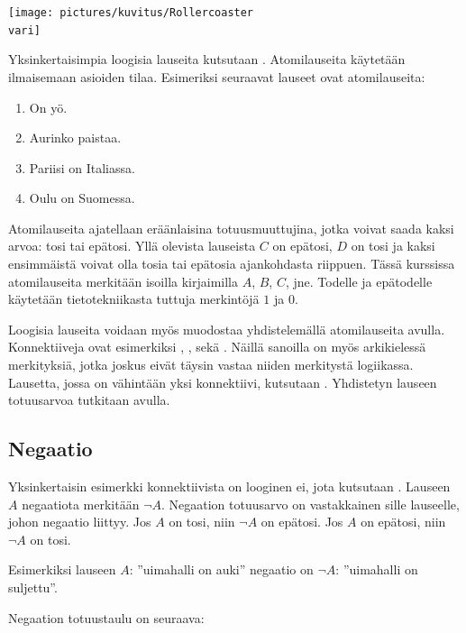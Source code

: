 \bigskip

\begin{center}
\texttt{[image: pictures/kuvitus/Rollercoaster\\vari]}
\end{center}

\bigskip

Yksinkertaisimpia loogisia lauseita kutsutaan . Atomilauseita käytetään ilmaisemaan asioiden tilaa. Esimeriksi seuraavat lauseet ovat atomilauseita:
\begin{enumerate}[$A:$]
\item On yö.
\item Aurinko paistaa.
\item Pariisi on Italiassa.
\item Oulu on Suomessa.
\end{enumerate}
Atomilauseita ajatellaan eräänlaisina totuusmuuttujina, jotka voivat saada kaksi arvoa: tosi tai epätosi. Yllä olevista lauseista $C$ on epätosi, $D$ on tosi ja kaksi ensimmäistä voivat olla tosia tai epätosia ajankohdasta riippuen. Tässä kurssissa atomilauseita merkitään isoilla kirjaimilla $A$, $B$, $C$, jne. Todelle ja epätodelle käytetään tietotekniikasta tuttuja merkintöjä $1$ ja $0$.

Loogisia lauseita voidaan myös muodostaa yhdistelemällä atomilauseita  avulla. Konnektiiveja ovat esimerkiksi , ,  sekä . Näillä sanoilla on myös arkikielessä merkityksiä, jotka joskus eivät täysin vastaa niiden merkitystä logiikassa. Lausetta, jossa on vähintään yksi konnektiivi, kutsutaan . Yhdistetyn lauseen totuusarvoa tutkitaan  avulla.

\subsection*{Negaatio} Yksinkertaisin esimerkki konnektiivista on looginen ei, jota kutsutaan . Lauseen $A$ negaatiota merkitään $\lnot A$. Negaation totuusarvo on vastakkainen sille lauseelle, johon negaatio liittyy. Jos $A$ on tosi, niin $\lnot A$ on epätosi. Jos $A$ on epätosi, niin $\lnot A$ on tosi.

Esimerkiksi lauseen $A$: ''uimahalli on auki'' negaatio on $\lnot A$: ''uimahalli on suljettu''.

Negaation totuustaulu on seuraava:

